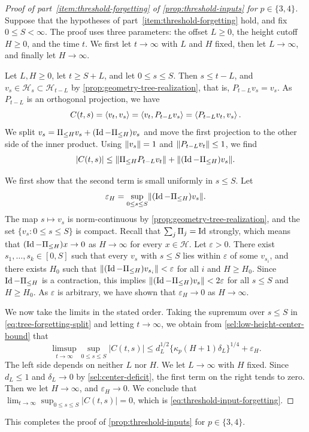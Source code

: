 \begin{proof}[Proof of part~\ref{item:threshold-forgetting} of \cref{prop:threshold-inputs} for $p\in\{3,4\}$]
Suppose that the hypotheses of part~\ref{item:threshold-forgetting} hold, and fix $0\le S<\infty$. The proof uses three parameters: the offset $L\ge0$, the height cutoff $H\ge0$, and the time $t$. We first let $t\to\infty$ with $L$ and $H$ fixed, then let $L\to\infty$, and finally let $H\to\infty$.

Let $L,H\ge0$, let $t\ge S+L$, and let $0\le s\le S$. Then $s\le t-L$, and $v_s\in\mathcal H_s\subset\mathcal H_{t-L}$ by \cref{prop:geometry-tree-realization}, that is, $P_{t-L}v_s=v_s$. As $P_{t-L}$ is an orthogonal projection, we have
\[
 C(t,s)=\left\langle v_t,v_s\right\rangle=\left\langle v_t,P_{t-L}v_s\right\rangle=\left\langle P_{t-L}v_t,v_s\right\rangle.
\]
We split $v_s=\Pi_{\le H}v_s+(\operatorname{Id}-\Pi_{\le H})v_s$ and move the first projection to the other side of the inner product. Using $\lVert v_s\rVert=1$ and $\lVert P_{t-L}v_t\rVert\le1$, we find
\begin{equation}\label{eq:tree-forgetting-split}
 |C(t,s)|\le\lVert\Pi_{\le H}P_{t-L}v_t\rVert+\lVert(\operatorname{Id}-\Pi_{\le H})v_s\rVert.
\end{equation}

We first show that the second term is small uniformly in $s\le S$. Let
\[
 \varepsilon_H=\sup_{0\le s\le S}\lVert(\operatorname{Id}-\Pi_{\le H})v_s\rVert.
\]
The map $s\mapsto v_s$ is norm-continuous by \cref{prop:geometry-tree-realization}, and the set $\{v_s:0\le s\le S\}$ is compact. Recall that $\sum_j\Pi_j=\operatorname{Id}$ strongly, which means that $(\operatorname{Id}-\Pi_{\le H})x\to0$ as $H\to\infty$ for every $x\in\mathcal H$. Let $\varepsilon>0$. There exist $s_1,\dots,s_k\in[0,S]$ such that every $v_s$ with $s\le S$ lies within $\varepsilon$ of some $v_{s_i}$, and there exists $H_0$ such that $\lVert(\operatorname{Id}-\Pi_{\le H})v_{s_i}\rVert<\varepsilon$ for all $i$ and $H\ge H_0$. Since $\operatorname{Id}-\Pi_{\le H}$ is a contraction, this implies $\lVert(\operatorname{Id}-\Pi_{\le H})v_s\rVert<2\varepsilon$ for all $s\le S$ and $H\ge H_0$. As $\varepsilon$ is arbitrary, we have shown that $\varepsilon_H\to0$ as $H\to\infty$.

We now take the limits in the stated order. Taking the supremum over $s\le S$ in \eqref{eq:tree-forgetting-split} and letting $t\to\infty$, we obtain from \eqref{sel:low-height-center-bound} that
\[
 \limsup_{t\to\infty}\sup_{0\le s\le S}|C(t,s)|
 \le d_L^{1/2}\bigl\{\kappa_p(H+1)\delta_L\bigr\}^{1/4}+\varepsilon_H.
\]
The left side depends on neither $L$ nor $H$. We let $L\to\infty$ with $H$ fixed. Since $d_L\le1$ and $\delta_L\to0$ by \eqref{sel:center-deficit}, the first term on the right tends to zero. Then we let $H\to\infty$, and $\varepsilon_H\to0$. We conclude that $\lim_{t\to\infty}\sup_{0\le s\le S}|C(t,s)|=0$, which is \eqref{eq:threshold-input-forgetting}.
\end{proof}

This completes the proof of \cref{prop:threshold-inputs} for $p\in\{3,4\}$.
